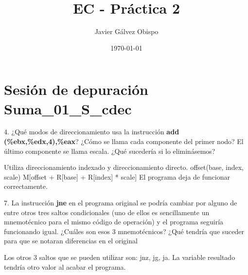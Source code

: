 \documentclass{article}
\begin{document}
\title{\Huge EC - Práctica 2}
\author{\Large Javier Gálvez Obispo}
\date{\large\today}
\maketitle

\section{Sesión de depuración Suma\_01\_S\_cdec}
  \begin{flushleft}
    {\large 4. ¿Qué modos de direccionamiento usa la instrucción \textbf{add (\%ebx,\%edx,4),\%eax}?
    ¿Cómo se llama cada componente del primer nodo? El último componente se llama escala.
    ¿Qué sucedería si lo eliminásemos?} \break

    Utiliza direccionamiento indexado y direccionamiento directo. \break
    offset(base, index, scale) \break
    M[offset + R[base] + R[index] * scale] \break
    El programa deja de funcionar correctamente.

    \vspace{\baselineskip}
    {\large 7. La instrucción \textbf{jne} en el programa original se podría cambiar por
    alguno de entre otros tres saltos condicionales (uno de ellos es sencillamente un
    mnemotécnico para el mismo código de operación) y el programa seguiría funcionando igual.
    ¿Cuáles son esos 3 mnemotécnicos? ¿Qué tendría que suceder para que se notaran diferencias
    en el original} \break

    Los otros 3 saltos que se pueden utilizar son: jnz, jg, ja. \break
    La variable resultado tendría otro valor al acabar el programa.
  \end{flushleft}
\end{document}
